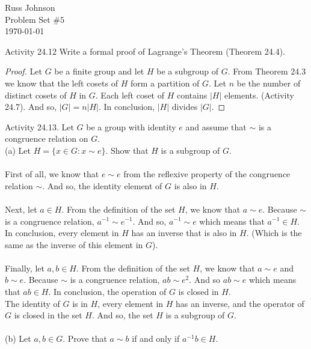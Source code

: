 \documentclass[11pt,a4paper]{article}
\begin{document}
\begin{flushright}
Russ Johnson\\
Problem Set $\#5$\\
\today\\
\end{flushright}

Activity 24.12 Write a formal proof of Lagrange's Theorem (Theorem 24.4).\\
\begin{proof}
Let $G$ be a finite group and let $H$ be a subgroup of $G$. From Theorem 24.3 we know that the left cosets of $H$ form a partition of $G$. Let $n$ be the number of distinct cosets of $H$ in $G$. Each left coset of $H$ contains $|H|$ elements. (Activity 24.7). And so, $|G| = n|H|$. In conclusion, $|H|$ divides $|G|$.
\end{proof}
Activity 24.13. Let $G$ be a group with identity $e$ and assume that $\sim$ is a congruence relation on $G$.\\
(a) Let $H = \{x \in G : x \sim e\}$. Show that $H$ is a subgroup of $G$.\\
~\\
First of all, we know that $e\sim e$ from the reflexive property of the congruence relation $\sim$. And so, the identity element of $G$ is also in $H$.\\
~\\
Next, let $a\in H$. From the definition of the set $H$, we know that $a\sim e$. Because $\sim$ is a congruence relation,  $a^{-1} \sim e^{-1} $. And so, $a^{-1} \sim e$ which means that $a^{-1}\in H$. In conclusion, every element in $H$ has an inverse that is also in $H$. (Which is the same as the inverse of this element in $G$).\\
~\\
Finally, let $a,b\in H$. From the definition of the set $H$, we know that $a\sim e$ and $b\sim e$. Because $\sim$ is a congruence relation,  $ab \sim e^2 $. And so $ab \sim e$ which means that $ab\in H$. In conclusion, the operation of $G$ is closed in $H$.
~\\
The identity of $G$ is in $H$, every element in $H$ has an inverse, and the operator of $G$ is closed in the set $H$. And so, the set $H$ is a subgroup of $G$.\\
~\\
(b) Let $a, b \in G$. Prove that $a \sim b$ if and only if $a^{-1} b \in H$.\\
\end{document}
